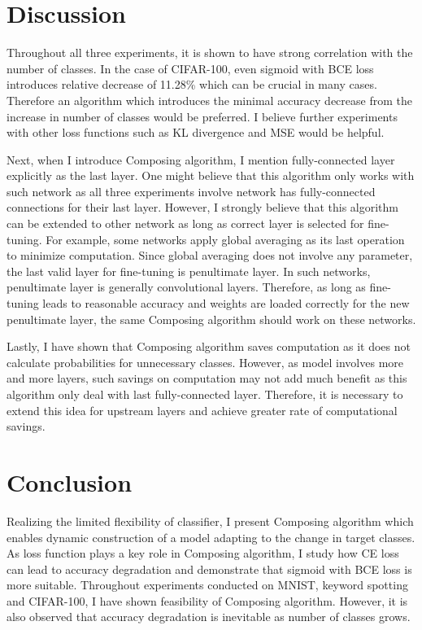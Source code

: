 \documentclass{article}
\begin{document}
\section{Discussion}

Throughout all three experiments, it is shown to have strong correlation with the number of classes. In the case of CIFAR-100, even sigmoid with BCE loss introduces relative decrease of 11.28\% which can be crucial in many cases. Therefore an algorithm which introduces the minimal accuracy decrease from the increase in number of classes would be preferred. I believe further experiments with other loss functions such as KL divergence and MSE would be helpful.

Next, when I introduce Composing algorithm, I mention fully-connected layer explicitly as the last layer. One might believe that this algorithm only works with such network as all three experiments involve network has fully-connected connections for their last layer. However, I strongly believe that this algorithm can be extended to other network as long as correct layer is selected for fine-tuning. For example, some networks apply global averaging as its last operation to minimize computation. Since global averaging does not involve any parameter, the last valid layer for fine-tuning is penultimate layer. In such networks, penultimate layer is generally convolutional layers. Therefore, as long as fine-tuning leads to reasonable accuracy and weights are loaded correctly for the new penultimate layer, the same Composing algorithm should work on these networks.

Lastly, I have shown that Composing algorithm saves computation as it does not calculate probabilities for unnecessary classes. However, as model involves more and more layers, such savings on computation may not add much benefit as this algorithm only deal with last fully-connected layer. Therefore, it is necessary to extend this idea for upstream layers and achieve greater rate of computational savings.

\section{Conclusion}

Realizing the limited flexibility of classifier, I present Composing algorithm which enables dynamic construction of a model adapting to the change in target classes. As loss function plays a key role in Composing algorithm, I study how CE loss can lead to accuracy degradation and demonstrate that sigmoid with BCE loss is more suitable. Throughout experiments conducted on MNIST, keyword spotting and CIFAR-100, I have shown feasibility of Composing algorithm. However, it is also observed that accuracy degradation is inevitable as number of classes grows.

\newpage

\nocite{*}



\end{document}
